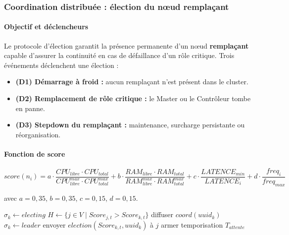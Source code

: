 \documentclass[12pt,a4paper]{report}
\begin{document}
\subsubsection{Coordination distribuée : élection du nœud remplaçant}

\paragraph{Objectif et déclencheurs}

Le protocole d'élection garantit la présence permanente d'un nœud \textbf{remplaçant} capable d'assurer la continuité en cas de défaillance d'un rôle critique. Trois événements déclenchent une élection :

\begin{itemize}
    \item[$\bullet$] \textbf{(D1) Démarrage à froid :} aucun remplaçant n'est présent dans le cluster.
    \item[$\bullet$] \textbf{(D2) Remplacement de rôle critique :} le Master ou le Contrôleur tombe en panne.
    \item[$\bullet$] \textbf{(D3) Stepdown du remplaçant :} maintenance, surcharge persistante ou réorganisation.
\end{itemize}

\paragraph{Fonction de score}

\[
score(n_i) =
a \cdot \frac{CPU_{libre} \cdot CPU_{total}}{CPU_{libre}^{max} \cdot CPU_{total}^{max}}
+ b \cdot \frac{RAM_{libre} \cdot RAM_{total}}{RAM_{libre}^{max} \cdot RAM_{total}^{max}}
+ c \cdot \frac{LATENCE_{min}}{LATENCE_i}
+ d \cdot \frac{freq_i}{freq_{max}}
\]

avec $a = 0{,}35$, $b = 0{,}35$, $c = 0{,}15$, $d = 0{,}15$.

\begin{algorithm}[H]
\caption{Initiation d'une élection par le nœud $k$}
\begin{algorithmic}[1]
\State $\sigma_k \gets electing$
\State $H \gets \{ j \in V \mid Score_{j,t} > Score_{k,t} \}$
    \State diffuser $coord(uuid_k)$
    \State $\sigma_k \gets leader$
\Else
        \State envoyer $election(Score_{k,t}, uuid_k)$ à $j$
    \EndFor
    \State armer temporisation $T_{attente}$
\EndIf
\end{algorithmic}
\end{algorithm}
\end{document}
